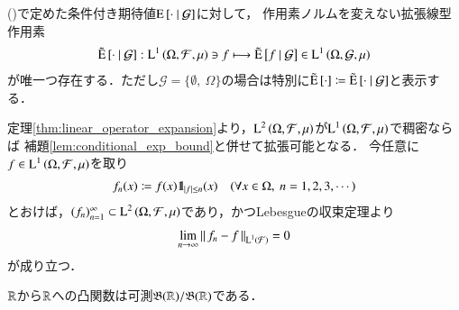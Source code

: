 	\begin{screen}
		\begin{thm}[条件付き期待値作用素の拡張]
			()で定めた条件付き期待値$\operatorname{E} \left[ \cdot \ \middle|\ \mathcal{G} \right]$に対して，
			作用素ノルムを変えない拡張線型作用素
			\begin{align}
				\tilde{\operatorname{E}} \left[ \cdot \ \middle|\ \mathcal{G} \right]:\operatorname{L}^{1} \left(\Omega,\mathcal{F},\mu\right) \ni f \longmapsto \tilde{\operatorname{E}} \left[ f \ \middle|\ \mathcal{G} \right] \in \operatorname{L}^{1} \left(\Omega,\mathcal{G},\mu\right)
			\end{align}
			が唯一つ存在する．ただし$\mathcal{G} = \{\emptyset,\ \Omega\}$の場合は特別に$\tilde{\operatorname{E}} \left[ \cdot \right] \coloneqq \tilde{\operatorname{E}} \left[ \cdot \ \middle|\ \mathcal{G} \right]$と表示する．
			\label{thm:conditional_exp_expansion}
		\end{thm}
	\end{screen}
	
	\begin{prf}	
		定理\ref{thm:linear_operator_expansion}より，$\operatorname{L}^{2} \left(\Omega,\mathcal{F},\mu\right)$が$\operatorname{L}^{1} \left(\Omega,\mathcal{F},\mu\right)$で稠密ならば
		補題\ref{lem:conditional_exp_bound}と併せて拡張可能となる．
		今任意に$f \in \operatorname{L}^{1} \left(\Omega,\mathcal{F},\mu\right)$を取り
		\begin{align}
			f_n(x) \coloneqq f(x) \mbox{1}\hspace{-0.25em}\mbox{l}_{|f| \leq n} (x) \quad (\forall x \in \Omega,\ n=1,2,3,\cdots) \label{conditional_exp_expansion}
		\end{align}
		とおけば，$(f_n)_{n=1}^{\infty} \subset \operatorname{L}^{2} \left(\Omega,\mathcal{F},\mu\right)$であり，かつLebesgueの収束定理より
		\begin{align}
			\lim_{n \to \infty} \left\|\, f_n - f\, \right\|_{\operatorname{L}^{1} \left(\mathcal{F}\right)} = 0
		\end{align}
		が成り立つ．
		\QED
	\end{prf}
	
	\begin{screen}
		\begin{lem}[凸関数の可測性]
			$\mathbb{R}$から$\mathbb{R}$への凸関数は可測$\mathfrak{B}(\mathbb{R})/\mathfrak{B}(\mathbb{R})$である．
			\label{lem:convex_function_measurability}
		\end{lem}
	\end{screen}
	
